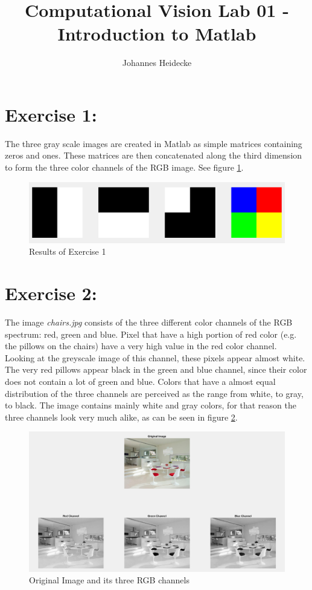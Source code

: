 \documentclass[11pt]{article}
\title{Computational Vision Lab 01 - Introduction to Matlab}
\author{Johannes Heidecke}
\begin{document}
\maketitle


\section*{Exercise 1:}

The three gray scale images are created in Matlab as simple matrices containing zeros and ones. These matrices are then concatenated along the third dimension to form the three color channels of the RGB image. See figure \ref{fig:task1}.

\begin{figure}[!hbt]
  \includegraphics[width=\textwidth]{task1}
  \caption{Results of Exercise 1}
  \label{fig:task1}
\end{figure}


\section*{Exercise 2:}

The image \textit{chairs.jpg} consists of the three different color channels of the RGB spectrum: red, green and blue. Pixel that have a high portion of red color (e.g. the pillows on the chairs) have a very high value in the red color channel. Looking at the greyscale image of this channel, these pixels appear almost white. The very red pillows appear black in the green and blue channel, since their color does not contain a lot of green and blue. Colors that have a almost equal distribution of the three channels are perceived as the range from white, to gray, to black. The image contains mainly white and gray colors, for that reason the three channels look very much alike, as can be seen in figure \ref{fig:task2}.

\begin{figure}[!hbt]
  \includegraphics[width=\textwidth]{task2}
  \caption{Original Image and its three RGB channels}
  \label{fig:task2}
\end{figure}
\end{document}

